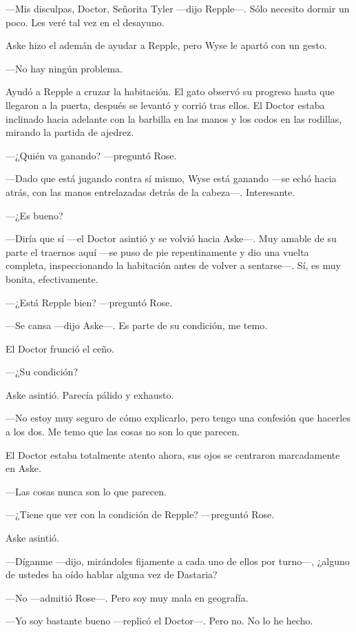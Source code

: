 {---Mis disculpas, Doctor, Señorita Tyler ---dijo Repple---. Sólo
necesito dormir un poco. Les veré tal vez en el desayuno.}

{Aske hizo el ademán de ayudar a Repple, pero Wyse le apartó con un
gesto.}

{---No hay ningún problema.}

{Ayudó a Repple a cruzar la habitación. El gato observó su progreso
	hasta que llegaron a la puerta, después se levantó y corrió tras ellos.
	El Doctor estaba inclinado hacia adelante con la barbilla en las manos y
los codos en las rodillas, mirando la partida de ajedrez.}

{---¿Quién va ganando? ---preguntó Rose.}

{---Dado que está jugando contra sí mismo, Wyse está ganando ---se echó
	hacia atrás, con las manos entrelazadas detrás de la cabeza---.
Interesante.}

{---¿Es bueno?}

{---Diría que sí ---el Doctor asintió y se volvió hacia Aske---. Muy
	amable de su parte el traernos aquí ---se puso de pie repentinamente y
	dio una vuelta completa, inspeccionando la habitación antes de volver a
sentarse---. Sí, es muy bonita, efectivamente.}

{---¿Está Repple bien? ---preguntó Rose.}

{---Se cansa ---dijo Aske---. Es parte de su condición, me temo.}

{El Doctor frunció el ceño.}

{---¿Su condición?}

{Aske asintió. Parecía pálido y exhausto.}

{---No estoy muy seguro de cómo explicarlo, pero tengo una confesión que
hacerles a los dos. Me temo que las cosas no son lo que parecen.}

{El Doctor estaba totalmente atento ahora, sus ojos se centraron
marcadamente en Aske.}

{---Las cosas nunca son lo que parecen.}

{---¿Tiene que ver con la condición de Repple? ---preguntó Rose.}

{Aske asintió.}

{---Díganme ---dijo, mirándoles fijamente a cada uno de ellos por
turno---, ¿alguno de ustedes ha oído hablar alguna vez de Dastaria?}

{---No ---admitió Rose---. Pero soy muy mala en geografía.}

{---Yo soy bastante bueno ---replicó el Doctor---. Pero no. No lo he
hecho.}

